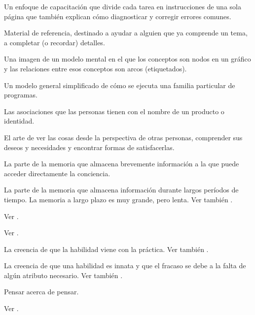 \begin{description}
 Un enfoque de capacitación que divide
cada tarea en instrucciones de una sola página que también
explican cómo diagnosticar y corregir errores comunes.

 Material de referencia, destinado a ayudar a alguien que ya comprende un tema, a completar (o recordar) detalles.

 Una imagen de un modelo mental en el que
los conceptos son nodos en un gráfico y las relaciones entre esos conceptos son arcos (etiquetados).

 Un modelo general simplificado de cómo se ejecuta una familia particular de programas.

 Las asociaciones que las personas tienen con el nombre de un producto o
identidad.

 El arte de ver las cosas desde la perspectiva
de otras personas, comprender sus deseos y necesidades y encontrar
formas de satisfacerlas.

 La parte de la memoria que almacena brevemente información a la que 
puede acceder directamente la conciencia.

 La parte de la memoria que
almacena información durante largos períodos de tiempo. La memoria a largo plazo es muy grande,
pero lenta. Ver también .

 Ver .

 Ver .

 La creencia de que la habilidad
viene con la práctica. Ver también .

 La creencia de que una habilidad es innata y que
el fracaso se debe a la falta de algún atributo necesario. Ver también
.

 Pensar acerca de pensar.

 Ver .


\end{description}
